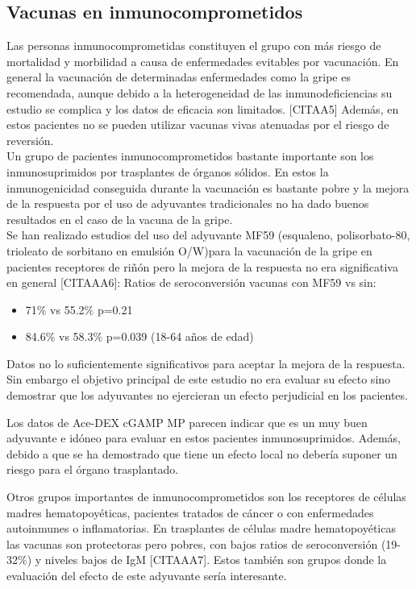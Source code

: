 \documentclass[a4paper,11pt]{article}
\begin{document}
\subsection{Vacunas en inmunocomprometidos}
Las personas inmunocomprometidas constituyen el grupo con más riesgo de mortalidad y morbilidad a causa de enfermedades evitables por vacunación. En general la vacunación de determinadas enfermedades como la gripe es recomendada, aunque debido a la heterogeneidad de las inmunodeficiencias su estudio se complica y los datos de eficacia son limitados. [CITAA5] Además, en estos pacientes no se pueden utilizar vacunas vivas atenuadas por el riesgo de reversión. 
\\Un grupo de pacientes inmunocomprometidos bastante importante son los inmunosuprimidos por trasplantes de órganos sólidos. En estos la inmunogenicidad conseguida durante la vacunación es bastante pobre y la mejora de la respuesta por el uso de adyuvantes tradicionales no ha dado buenos resultados en el caso de la vacuna de la gripe. 
\\Se han realizado estudios del uso del adyuvante MF59 (esqualeno, polisorbato-80, trioleato de sorbitano en emulsión O/W)para la vacunación de la gripe en pacientes receptores de riñón pero la mejora de la respuesta no era significativa en general [CITAAA6]:
Ratios de seroconversión vacunas con MF59 vs sin:
\begin{itemize}
	\item 71\% vs 55.2\% p=0.21
	\item 84.6\% vs 58.3\% p=0.039 (18-64 años de edad)
\end{itemize}
Datos no lo suficientemente significativos para aceptar la mejora de la respuesta. Sin embargo el objetivo principal de este estudio no era evaluar su efecto sino demostrar que los adyuvantes no ejercieran un efecto perjudicial en los pacientes.

Los datos de Ace-DEX cGAMP MP parecen indicar que es un muy buen adyuvante e idóneo para evaluar en estos pacientes inmunosuprimidos. Además, debido a que se ha demostrado que tiene un efecto local no debería suponer un riesgo para el órgano trasplantado. 

Otros grupos importantes de inmunocomprometidos son los receptores de células madres hematopoyéticas, pacientes tratados de cáncer o con enfermedades autoinmunes o inflamatorias. En trasplantes de células madre hematopoyéticas las vacunas son protectoras pero pobres, con bajos ratios de seroconversión (19-32\%) y niveles bajos de IgM [CITAAA7]. Estos también son grupos donde la evaluación del efecto de este adyuvante sería interesante.
\end{document}
